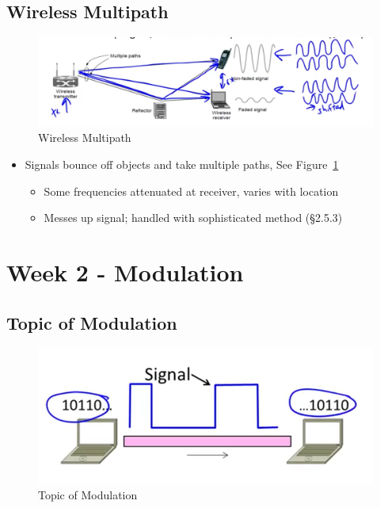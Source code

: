 \documentclass[12pt]{ctexart}   %
\begin{document}
	 \subsection{Wireless Multipath}
	 
	 \begin{figure}[h!] %
	 \centering
	 \includegraphics[scale=0.7]{images/2-3-10}
	\caption{ Wireless Multipath}
	 \label{fig:2-3-10}
	 \end{figure}
	 
	 \begin{itemize}
	 	\item Signals bounce off objects and take multiple paths, See Figure~\ref{fig:2-3-10}
	 	\begin{itemize}
	 		\item Some frequencies attenuated at receiver, varies with location
	 		\item Messes up signal; handled with sophisticated method (§2.5.3)
	 	\end{itemize}
	 \end{itemize}
	 
\section{Week 2 - Modulation}
	\subsection{Topic of Modulation}
	 \begin{figure}[h!] %
	 \centering
	 \includegraphics[scale=0.7]{images/2-4-1}
	\caption{ Topic of Modulation}
	 \label{fig:2-4-1}
	 \end{figure}
	 
\end{document}
